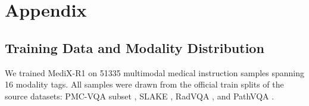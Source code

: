 \documentclass{article}
\theoremstyle{plain}
\theoremstyle{definition}
\theoremstyle{remark}
\begin{document}
\section{Appendix}

\subsection{Training Data and Modality Distribution}
\label{app:training-data}

We trained MediX-R1 on 51335 multimodal medical instruction samples spanning 16 modality tags. All samples were drawn from the official train splits of the source datasets: PMC-VQA subset \citep{zhang2024pmcvqavisualinstructiontuning}, SLAKE \citep{liu2021slake}, RadVQA \citep{lau2018dataset}, and PathVQA \citep{he2020pathvqa30000questionsmedical}.
\end{document}
